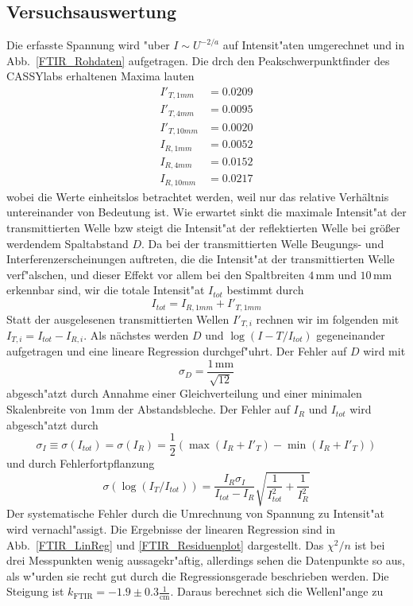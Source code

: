 \documentclass[12pt,a4paper]{article}
\begin{document}
\subsection{Versuchsauswertung}
Die erfasste Spannung wird "uber $I\sim U^{-2/a}$  auf Intensit"aten umgerechnet und in Abb.~\ref{FTIR_Rohdaten} aufgetragen. Die drch den Peakschwerpunktfinder des CASSYlabs erhaltenen Maxima lauten
\begin{align}
I'_{T,1mm}&=0.0209\\
I'_{T,4mm}&=0.0095\\
I'_{T,10mm}&=0.0020\\
I_{R,1mm}&=0.0052\\
I_{R,4mm}&=0.0152\\
I_{R,10mm}&=0.0217
\end{align} 
wobei die Werte einheitslos betrachtet werden, weil nur das relative Verhältnis untereinander von Bedeutung ist. Wie erwartet sinkt die maximale Intensit"at der transmittierten Welle bzw steigt die Intensit"at der reflektierten Welle bei größer werdendem Spaltabstand $D$. Da bei der transmittierten Welle Beugungs- und Interferenzerscheinungen auftreten, die die Intensit"at der transmittierten Welle verf"alschen, und dieser Effekt vor allem bei den Spaltbreiten $4\,\text{mm}$ und $10\,\text{mm}$ erkennbar sind, wir die totale Intensit"at $I_{tot}$ bestimmt durch
\begin{equation}
I_{tot}=I_{R,1mm}+I'_{T,1mm}
\end{equation}
Statt der ausgelesenen transmittierten Wellen $I'_{T,i}$ rechnen wir im folgenden mit $I_{T,i}=I_{tot}-I_{R,i}$. Als nächstes werden $D$ und $\log(I-T/I_{tot})$ gegeneinander aufgetragen und eine lineare Regression durchgef"uhrt. Der Fehler auf $D$ wird mit 
\begin{equation}
\sigma_D=\frac{1\,\text{mm}}{\sqrt{12}}
\end{equation}
abgesch"atzt durch Annahme einer Gleichverteilung und einer minimalen Skalenbreite von 1mm der Abstandsbleche. Der Fehler auf $I_R$ und $I_{tot}$ wird abgesch"atzt durch 
\begin{equation}
\sigma_I\equiv\sigma(I_{tot})=\sigma(I_R)=\frac{1}{2}(\max(I_R+I'_T)-\min(I_R+I'_T))
\end{equation}
und durch Fehlerfortpflanzung
\begin{equation}
\sigma({\log(I_T/I_{tot})})=\frac{I_R\sigma_{I}}{I_{tot}-I_R}\sqrt{\frac{1}{I_{tot}^2}+\frac{1}{I_R^2}}
\end{equation}
Der systematische Fehler durch die Umrechnung von Spannung zu Intensit"at wird vernachl"assigt. Die Ergebnisse der linearen Regression sind in Abb.~\ref{FTIR_LinReg} und \ref{FTIR_Residuenplot} dargestellt. Das $\chi^2/n$ ist bei drei Messpunkten wenig aussagekr"aftig, allerdings sehen die Datenpunkte so aus, als w"urden sie recht gut durch die Regressionsgerade beschrieben werden. Die Steigung ist $k_{\text{FTIR}}=-1.9\pm0.3\frac{1}{\text{cm}}$. Daraus berechnet sich die Wellenl"ange zu 
\end{document}
